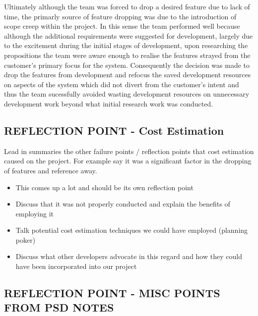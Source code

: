 \documentclass{l3proj}
\begin{document}
Ultimately although the team was forced to drop a desired feature due to lack of time, the primarly source of feature dropping was due to the introduction of scope creep within the project. In this sense the team performed well because although the additional requirements were suggested for development, largely due to the excitement during the initial stages of development, upon researching the propositions the team were aware enough to realise the features strayed from the customer's primary focus for the system. Consequently the decision was made to drop the features from development and refocus the saved development resources on aspects of the system which did not divert from the customer's intent and thus the team sucessfully avoided wasting development resources on unnecessary development work beyond what initial research work was conducted. 


\subsection{REFLECTION POINT - Cost Estimation}
\label{sec:droppingreflection}

Lead in summaries the other failure points / reflection points that cost estimation caused on the project. For example say it was a significant factor in the dropping of features and reference away. 

\begin{itemize}
\item This comes up a lot and should be its own reflection point
\item Discuss that it was not properly conducted and explain the benefits of employing it
\item Talk potential cost estimation techniques we could have employed (planning poker)
\item Discuss what other developers advocate in this regard and how they could have been incorporated into our project
\end{itemize}


\subsection{REFLECTION POINT - MISC POINTS FROM PSD NOTES}
\label{sec:miscpsd}
\end{document}
